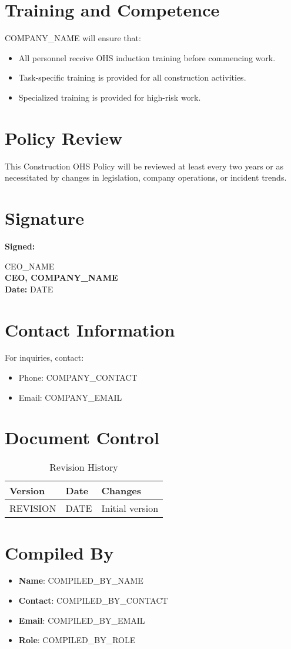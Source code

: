 \documentclass[12pt]{article}
\begin{document}
\section{Training and Competence}
{{COMPANY_NAME}} will ensure that:
\begin{itemize}
    \item All personnel receive OHS induction training before commencing work.
    \item Task-specific training is provided for all construction activities.
    \item Specialized training is provided for high-risk work.
\end{itemize}

\section{Policy Review}
This Construction OHS Policy will be reviewed at least every two years or as necessitated by changes in legislation, company operations, or incident trends.

\section{Signature}
\textbf{Signed:}

{{CEO_NAME}}\\
\textbf{CEO, {{COMPANY_NAME}}}\\
\textbf{Date:} {{DATE}}

\section{Contact Information}
For inquiries, contact:
\begin{itemize}
    \item Phone: {{COMPANY_CONTACT}}
    \item Email: {{COMPANY_EMAIL}}
\end{itemize}

\section{Document Control}
\begin{table}[h]
    \centering
    \begin{tabular}{p{3cm}p{3cm}p{6cm}}
        \toprule
        \textbf{Version} & \textbf{Date} & \textbf{Changes} \\
        \midrule
        {{REVISION}} & {{DATE}} & Initial version \\
        \bottomrule
    \end{tabular}
    \caption{Revision History}
\end{table}

\section{Compiled By}
\begin{itemize}
    \item \textbf{Name}: {{COMPILED_BY_NAME}}
    \item \textbf{Contact}: {{COMPILED_BY_CONTACT}}
    \item \textbf{Email}: {{COMPILED_BY_EMAIL}}
    \item \textbf{Role}: {{COMPILED_BY_ROLE}}
\end{itemize}
\end{document}
